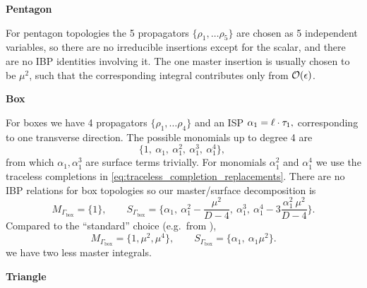 \textbf{Pentagon}

For pentagon topologies the 5 propagators $\{\rho_1,\ldots{}\rho_5\}$ are chosen as 5 independent variables,
so there are no irreducible insertions except for the scalar, and there are no IBP identities involving it. 
The one master insertion is usually chosen to be $\mu^2$, such that
the corresponding integral contributes only from  $\order{\epsilon}$.


\textbf{Box}

For boxes we have  4 propagators $\{\rho_1,\ldots{}\rho_4\}$ and an ISP $ \alpha_1 = \sp(\ell,\tau_1), $
corresponding to one transverse direction.
The possible monomials up to degree 4 are 
\[
  \{1,~\alpha_1,~\alpha_1^2,~\alpha_1^3,~\alpha_1^4\},~
\]
from which $\alpha_1,\alpha_1^3$ are surface terms trivially.
For monomials $\alpha_1^2$ and $\alpha_1^4$ we use the traceless completions in
\cref{eq:traceless_completion_replacements}. There are no IBP relations for box topologies so
our master/surface decomposition is
\[
  M_{\Gamma_\text{box} } = \{1\}, \qquad S_{\Gamma_\text{box} } = \{\alpha_1,~ \alpha_1^2 - \frac{\mu^2}{D-4},~ \alpha_1^3,~ \alpha_1^4 - 3 \frac{\alpha_1^2~\mu^2}{D-4}\}.
\]
Compared to the ``standard'' choice (e.g.\ from \cite{Giele:2008ve}),
\[
  M_{\Gamma_\text{box} } = \{1, \mu^2, \mu^4\}, \qquad S_{\Gamma_\text{box} } = \{\alpha_1,~ \alpha_1 \mu^2 \}.
\]
we have two less master integrals.



\textbf{Triangle}

